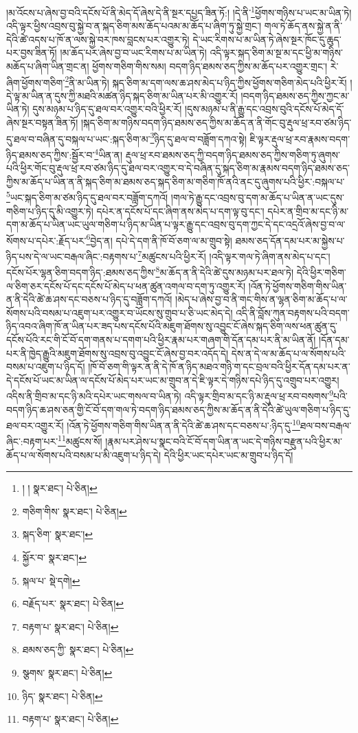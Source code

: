 །མ་འོངས་པ་ཞེས་བྱ་བའི་དངོས་པོ་ནི་མེད་དོ་ཞེས་དེ་ནི་སྔར་དཔྱད་ཟིན་ཏོ:། །དེ་ནི་\footnote{། །  སྣར་ཐང་།  པེ་ཅིན། }ཕྱོགས་གཉིས་པ་ཡང་མ་ཡིན་ཏེ། འདི་ལྟར་ཕྱིས་འབྲས་བུ་སྐྱེ་བ་ན་སྐད་ཅིག་མས་ཆོད་པའམ་མ་ཆོད་པ་ཞིག་ཏུ་སྐྱེ་གྲང་། གལ་ཏེ་ཆོད་ནས་སྐྱེ་ན་ནི་དེའི་ཚེ་འདས་པ་ཁོ་ན་ལས་སྐྱེ་བར་ཁས་བླངས་པར་འགྱུར་ཏེ། དེ་ཡང་རིགས་པ་མ་ཡིན་ཏེ་ཞེས་སྔར་ཁོང་དུ་ཆུད་པར་བྱས་ཟིན་ཏོ། །མ་ཆོད་པར་ཞེས་བྱ་བ་ཡང་རིགས་པ་མ་ཡིན་ཏེ། འདི་ལྟར་སྐད་ཅིག་མ་སྔ་མ་དང་ཕྱི་མ་གཉིས་མཆོད་པ་ཞིག་ཡིན་གྲང་ན། ཕྱོགས་གཅིག་གིས་སམ། བདག་ཉིད་ཐམས་ཅད་ཀྱིས་མ་ཆོད་པར་འགྱུར་གྲང་། རེ་ཞིག་ཕྱོགས་གཅིག་\footnote{གཅིག་གིས་  སྣར་ཐང་།  པེ་ཅིན། }ནི་མ་ཡིན་ཏེ། སྐད་ཅིག་མ་དག་ལས་ཆ་ཤས་མེད་པ་ཉིད་ཀྱིས་ཕྱོགས་གཅིག་མེད་པའི་ཕྱིར་རོ། །དེ་ལྟ་མ་ཡིན་ན་དུས་ཀྱི་མཐའི་མཚན་ཉིད་སྐད་ཅིག་མ་ཡིན་པར་མི་འགྱུར་རོ། །བདག་ཉིད་ཐམས་ཅད་ཀྱིས་ཀྱང་མ་ཡིན་ཏེ། དུས་མཉམ་པ་ཉིད་དུ་ཐལ་བར་འགྱུར་བའི་ཕྱིར་རོ། །དུས་མཉམ་པ་ནི་རྒྱུ་དང་འབྲས་བུའི་དངོས་པོ་མེད་དོ་ཞེས་སྔར་བསྟན་ཟིན་ཏོ། །སྐད་ཅིག་མ་གཉིས་བདག་ཉིད་ཐམས་ཅད་ཀྱིས་མ་ཆོད་ན་ནི་གོང་བུ་རྡུལ་ཕྲ་རབ་ཙམ་ཉིད་དུ་ཐལ་བ་བཞིན་དུ་བསྐལ་པ་ཡང་:སྐད་ཅིག་མ་\footnote{སྐད་ཅིག་  སྣར་ཐང་། }ཉིད་དུ་ཐལ་བ་བཟློག་དཀའ་སྟེ། ཇི་ལྟར་རྡུལ་ཕྲ་རབ་རྣམས་བདག་ཉིད་ཐམས་ཅད་ཀྱིས་:སྦྱོར་བ་\footnote{སྐྱོར་བ་  སྣར་ཐང་། }ཡིན་ན། རྡུལ་ཕྲ་རབ་ཐམས་ཅད་ཀྱི་བདག་ཉིད་ཐམས་ཅད་ཀྱིས་གཅིག་ཏུ་ཞུགས་པའི་ཕྱིར་གོང་བུ་རྡུལ་ཕྲ་རབ་ཙམ་ཉིད་དུ་ཐལ་བར་འགྱུར་བ་དེ་བཞིན་དུ་སྐད་ཅིག་མ་རྣམས་བདག་ཉིད་ཐམས་ཅད་ཀྱིས་མ་ཆོད་པ་ཡིན་ན་ནི་སྐད་ཅིག་མ་ཐམས་ཅད་སྐད་ཅིག་མ་གཅིག་ཁོ་ནའི་ནང་དུ་ཞུགས་པའི་ཕྱིར་:བསྐལ་པ་\footnote{སྐལ་པ་  སྡེ་དགེ། }ཡང་སྐད་ཅིག་མ་ཙམ་ཉིད་དུ་ཐལ་བར་བཟློག་དཀའོ། །གལ་ཏེ་རྒྱུ་དང་འབྲས་བུ་དག་མ་ཆོད་པ་ཡིན་ན་ཡང་དུས་གཅིག་པ་ཉིད་དུ་མི་འགྱུར་ཏེ། དཔེར་ན་དངོས་པོ་དང་ཞིག་ནས་མེད་པ་དག་ལྟ་བུ་དང་། དཔེར་ན་གྲིབ་མ་དང་ཉི་མ་དག་མ་ཆོད་པ་ཡིན་ཡང་ཡུལ་གཅིག་པ་ཉིད་མ་ཡིན་པ་ལྟར་རྒྱུ་དང་འབྲས་བུ་དག་ཀྱང་དེ་དང་འདྲའོ་ཞེས་བྱ་བ་ལ་སོགས་པ་དཔེར་:རྗོད་པར་\footnote{བརྗོད་པར་  སྣར་ཐང་།  པེ་ཅིན། }བྱེད་ན། དཔེ་དེ་དག་ནི་ཁོ་བོ་ཅག་ལ་མ་གྲུབ་སྟེ། ཐམས་ཅད་དོན་དམ་པར་མ་སྐྱེས་པ་ཉིད་པས་དེ་ལ་ཡང་བརྒལ་ཞིང་:བརྟགས་པ་\footnote{བརྟག་པ་  སྣར་ཐང་།  པེ་ཅིན། }མཚུངས་པའི་ཕྱིར་རོ། །འདི་ལྟར་གལ་ཏེ་ཞིག་ནས་མེད་པ་དང་། དངོས་པོར་ལྷན་ཅིག་བདག་ཉིད་:ཐམས་ཅད་ཀྱིས་\footnote{ཐམས་ཅད་ཀྱི་  སྣར་ཐང་།  པེ་ཅིན། }མ་ཆོད་ན་ནི་དེའི་ཚེ་དུས་མཉམ་པར་ཐལ་ཏེ། དེའི་ཕྱིར་གཅིག་ལ་ཅིག་ཅར་དངོས་པོ་དང་དངོས་པོ་མེད་པ་ཕན་ཚུན་འགལ་བ་དག་ཏུ་འགྱུར་རོ། །འོན་ཏེ་ཕྱོགས་གཅིག་གིས་ཡིན་ན་ནི་དེའི་ཚེ་ཆ་ཤས་དང་བཅས་པ་ཉིད་དུ་བཟློག་དཀའོ། །མེད་པ་ཞེས་བྱ་བ་ནི་གང་གིས་ན་ལྷན་ཅིག་མ་ཆོད་པ་ལ་སོགས་པའི་བསམ་པ་འཇུག་པར་འགྱུར་བ་ཡོངས་སུ་གྲུབ་པ་ཅི་ཡང་མེད་དེ། འདི་ནི་བློས་ཀུན་བརྟགས་པའི་བདག་ཉིད་འབའ་ཞིག་ཁོ་ན་ཡིན་པར་ཟད་པས་དངོས་པོའི་མཇུག་ཐོགས་སུ་འབྱུང་ངོ་ཞེས་སྐད་ཅིག་ལས་ཕན་ཚུན་དུ་དངོས་པོའི་རང་གི་ངོ་བོ་དག་གནས་པ་དགག་པའི་ཕྱིར་རྣམ་པར་གཞག་གི་དོན་དམ་པར་ནི་མ་ཡིན་ནོ། །དོན་དམ་པར་ནི་ཁྱེད་རྒྱུའི་མཇུག་ཐོགས་སུ་འབྲས་བུ་འབྱུང་ངོ་ཞེས་བྱ་བར་འདོད་དེ། དེས་ན་དེ་ལ་མ་ཆོད་པ་ལ་སོགས་པའི་བསམ་པ་འཇུག་པ་ཉིད་དོ། །ཁོ་བོ་ཅག་གི་ལྟར་ན་ནི་དེ་ཁོ་ན་ཉིད་མཐའ་གཉི་ག་དང་བྲལ་བའི་ཕྱིར་དོན་དམ་པར་ན་དེ་དངོས་པོ་ཡང་མ་ཡིན་ལ་དངོས་པོ་མེད་པར་ཡང་མ་གྲུབ་ན་དེ་ཇི་ལྟར་དེ་གཉིས་དཔེ་ཉིད་དུ་འགྲུབ་པར་འགྱུར། འདིས་ནི་གྲིབ་མ་དང་ཉི་མའི་དཔེར་ཡང་གསལ་བ་ཡིན་ཏེ། འདི་ལྟར་གྲིབ་མ་དང་ཉི་མ་རྡུལ་ཕྲ་རབ་བསགས་\footnote{སྩགས་  སྣར་ཐང་།  པེ་ཅིན། }པའི་བདག་ཉིད་ཆ་ཤས་ཅན་གྱི་ངོ་བོ་དག་གལ་ཏེ་བདག་ཉིད་ཐམས་ཅད་ཀྱིས་མ་ཆོད་ན་ནི་དེའི་ཚེ་ཡུལ་གཅིག་པ་ཉིད་དུ་ཐལ་བར་འགྱུར་རོ། །འོན་ཏེ་ཕྱོགས་གཅིག་གིས་ཡིན་ན་ནི་དེའི་ཚེ་ཆ་ཤས་དང་བཅས་པ་:ཉིད་དུ་\footnote{ཉིད་  སྣར་ཐང་།  པེ་ཅིན། }ཐལ་བས་བརྒལ་ཞིང་:བརྟག་པར་\footnote{བརྟག་པ་  སྣར་ཐང་།  པེ་ཅིན། }མཚུངས་སོ། །རྣམ་པར་ཤེས་པ་སྣང་བའི་ངོ་བོ་དག་ཡིན་ན་ཡང་དེ་གཉིས་བརྫུན་པའི་ཕྱིར་མ་ཆོད་པ་ལ་སོགས་པའི་བསམ་པ་མི་འཇུག་པ་ཉིད་དེ། དེའི་ཕྱིར་ཡང་དཔེར་ཡང་མ་གྲུབ་པ་ཉིད་དོ། 